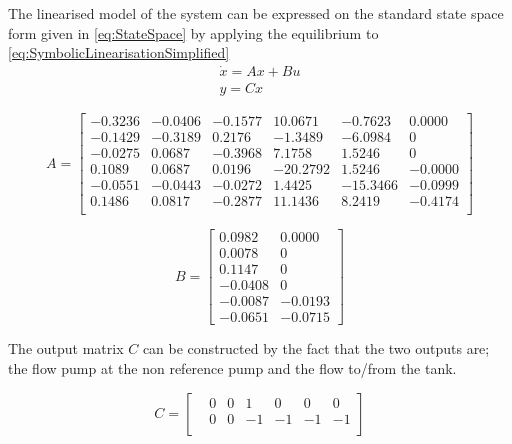 The linearised model of the system can be expressed on the standard state space form given in \cref{eq:StateSpace} by applying the equilibrium to \cref{eq:SymbolicLinearisationSimplified}
\begin{equation}\label{eq:StateSpace}
	\begin{split}
	\dot{x} = Ax + Bu \\
	y = Cx
	\end{split}
\end{equation}

\begin{equation}
	A = \begin{bmatrix}
		-0.3236 & -0.0406 & -0.1577 & 10.0671 & -0.7623 & 0.0000\\
		-0.1429 & -0.3189 & 0.2176 & -1.3489 & -6.0984  & 0\\
		-0.0275 & 0.0687 & -0.3968 & 7.1758 & 1.5246 & 0\\
		0.1089 & 0.0687 & 0.0196 & -20.2792 & 1.5246 & -0.0000\\
		-0.0551 & -0.0443 & -0.0272 & 1.4425 & -15.3466 &   -0.0999\\
		0.1486 & 0.0817 & -0.2877 & 11.1436 & 8.2419 & -0.4174\\
	\end{bmatrix}
\end{equation}

\begin{equation}
	B = \begin{bmatrix}
		0.0982 & 0.0000\\
		0.0078 & 0 \\
		0.1147 & 0 \\
		-0.0408 & 0 \\
		-0.0087 & -0.0193\\
		-0.0651 & -0.0715
	\end{bmatrix}
\end{equation}

The output matrix $ C $ can be constructed by the fact that the two outputs are; the flow pump at the non reference pump and the flow to/from the tank. 

\begin{equation}
C =	\begin{bmatrix}
	&0&0&1&0&0&0\\
	&0&0&-1&-1&-1&-1\\	
\end{bmatrix} 
\end{equation}

